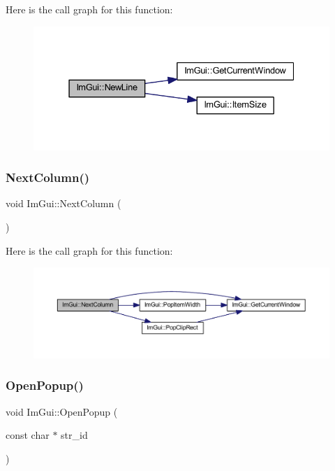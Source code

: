 Here is the call graph for this function\+:
\nopagebreak
\begin{figure}[H]
\begin{center}
\leavevmode
\includegraphics[width=331pt]{namespace_im_gui_a77f8b0a33e5335f98661f99e720411da_cgraph}
\end{center}
\end{figure}
\mbox{\label{namespace_im_gui_a8f97746d6a9d59c8400c26fb7613a2ff}} 
\subsubsection{\texorpdfstring{Next\+Column()}{NextColumn()}}
{\footnotesize\ttfamily void Im\+Gui\+::\+Next\+Column (\begin{DoxyParamCaption}{ }\end{DoxyParamCaption})}

Here is the call graph for this function\+:
\nopagebreak
\begin{figure}[H]
\begin{center}
\leavevmode
\includegraphics[width=350pt]{namespace_im_gui_a8f97746d6a9d59c8400c26fb7613a2ff_cgraph}
\end{center}
\end{figure}
\mbox{\label{namespace_im_gui_a9576648c40b92f54b671e2e51654dd2c}} 
\subsubsection{\texorpdfstring{Open\+Popup()}{OpenPopup()}}
{\footnotesize\ttfamily void Im\+Gui\+::\+Open\+Popup (\begin{DoxyParamCaption}\item[{const char $\ast$}]{str\+\_\+id }\end{DoxyParamCaption})}

